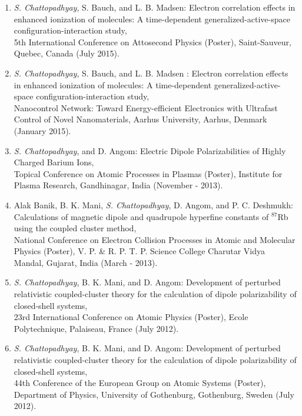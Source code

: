 \documentclass[12pt]{article}
\begin{document}
\begin{enumerate}
  \item {\sl S. Chattopadhyay}, S. Bauch, and L. B. Madsen:
        {\sf Electron correlation effects in enhanced ionization of molecules: A 
             time-dependent generalized-active-space configuration-interaction study}, \\
             5th International Conference on Attosecond Physics (Poster),
             Saint-Sauveur, Quebec, Canada (July 2015).
 
  \item {\sl S. Chattopadhyay}, S. Bauch, and L. B. Madsen :
        {\sf Electron correlation effects in enhanced ionization of molecules: A 
             time-dependent generalized-active-space configuration-interaction study}, \\
             Nanocontrol Network: Toward Energy-efficient Electronics with Ultrafast Control 
             of Novel Nanomaterials,
             Aarhus University, Aarhus, Denmark (January 2015).
  
  \item {\sl S. Chattopadhyay},  and  D. Angom: 
        {\sf Electric Dipole Polarizabilities of Highly Charged Barium Ions},\\
             Topical Conference on Atomic Processes in Plasmas (Poster),
             Institute for Plasma Research, Gandhinagar, India (November - 2013).

  \item  Alak Banik, B. K. Mani, {\sl S. Chattopadhyay}, D. Angom, and 
         P. C. Deshmukh:
         {\sf Calculations of magnetic dipole and quadrupole hyperfine 
              constants of $^{87}$Rb using the  coupled cluster method}, \\
              National Conference on Electron Collision Processes in Atomic 
              and Molecular Physics (Poster), V. P. \& R. P. T. P. Science 
              College Charutar Vidya Mandal, Gujarat, India (March - 2013).


  \item {\sl S. Chattopadhyay}, B. K. Mani, and  D. Angom:
        {\sf Development of perturbed relativistic coupled-cluster theory
            for the calculation of dipole polarizability of closed-shell
            systems}, \\
            23rd International Conference on Atomic Physics (Poster),
            Ecole Polytechnique, Palaiseau, France (July 2012).

  \item {\sl S. Chattopadhyay}, B. K. Mani, and  D. Angom:
        {\sf Development of perturbed relativistic coupled-cluster theory
             for the calculation of dipole polarizability of closed-shell
             systems}, \\
             44th Conference of the European Group on Atomic Systems
             (Poster), Department of Physics, University of Gothenburg,
             Gothenburg, Sweden (July 2012).


\end{enumerate}
\end{document}
